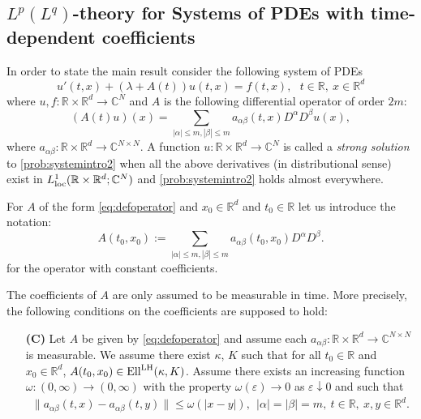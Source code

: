 \documentclass{amsart}
\theoremstyle{plain}
\theoremstyle{remark}
\theoremstyle{plain}
\numberwithin{equation}{section}
\begin{document}
\subsection{$L^p(L^q)$-theory for Systems of PDEs with time-dependent coefficients}
In order to state the main result consider the following system of PDEs
\begin{equation}\label{prob:systemintro2}
u'(t,x)+(\lambda+A(t))u(t,x)=f(t,x),\ \ \ t\in{ \mathbb{R} },\ x\in{ \mathbb{R} }^{d}
\end{equation}
where $u,f:{ \mathbb{R} }\times { \mathbb{R} }^d\to { \mathbb{C} }^N$ and $A$ is the following differential operator of order $2m$:
\begin{equation}\label{eq:defoperator}
(A(t) u)(x) = \sum_{|\alpha|\leq m,|\beta|\leq m} a_{\alpha\beta}(t,x)D^{\alpha} D^\beta u(x),
\end{equation}
where $a_{\alpha\beta}:{ \mathbb{R} }\times { \mathbb{R} }^{d}\rightarrow { \mathbb{C} }^{N\times N}$. A function $u:{ \mathbb{R} }\times{ \mathbb{R} }^d\to { \mathbb{C} }^N$ is called a {\em strong solution} to \eqref{prob:systemintro2} when all the above derivatives (in distributional sense) exist in $L^1_{\rm loc}({ \mathbb{R} }\times{ \mathbb{R} }^d;{ \mathbb{C} }^N)$ and \eqref{prob:systemintro2} holds almost everywhere.

For $A$ of the form \eqref{eq:defoperator} and $x_0\in { \mathbb{R} }^d$ and $t_0\in { \mathbb{R} }$ let us introduce the notation:
\[A(t_0,x_0) := \sum_{|\alpha|\leq m, |\beta|\leq m} a_{\alpha\beta}(t_0,x_0) D^{\alpha}D^{\beta}.\]
for the operator with constant coefficients.

The coefficients of $A$ are only assumed to be measurable in time. More precisely, the following conditions on the coefficients are supposed to hold:
\begin{enumerate}
\item[\textbf{(C)}] Let $A$ be given by \eqref{eq:defoperator} and assume each $a_{\alpha\beta}:{ \mathbb{R} }\times{ \mathbb{R} }^d\to { \mathbb{C} }^{N\times N}$ is measurable.
We assume there exist $\kappa$, $K$ such that for all $t_0\in { \mathbb{R} }$ and $x_0\in { \mathbb{R} }^d$, $A(t_0, x_0)\in {\rm Ell}^{\rm LH}(\kappa, K)$.
Assume there exists an increasing function $\omega:(0,\infty)\to (0,\infty)$ with the property $\omega(\varepsilon)\rightarrow 0$ as $\varepsilon\downarrow 0$ and such that
    \begin{align*}
    \|a_{\alpha\beta}(t,x)-a_{\alpha\beta}(t,y)\|\leq \omega(|x-y|), \ \ |\alpha| = |\beta|= m, \ t\in { \mathbb{R} }, \ x,y\in{ \mathbb{R} }^{d}.
\end{align*}
\end{enumerate}
\end{document}
